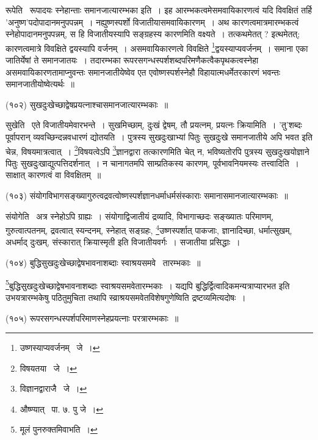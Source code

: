 \documentclass[11pt, openany]{book}
\begin{document}
{{\knu रूपेति} \textendash\ रूपादयः स्नेहान्ताः समानजात्यारम्भका इति~। इह आरम्भकत्वमेसमवायिकारणत्वं यदि विवक्षितं तर्हि 'अनुष्ण'पदोपादानमनुपपन्नम्~। नह्युष्णस्पर्शो विजातीयासमवायिकारणम्~। अथ कारणत्वमात्रमारम्भकत्वं स्नेहोपादानमनुपपन्नम्, स हि विजातीयस्यापि सङ्ग्रहस्य कारणमिति वक्ष्यते~। तत्कथमेतत् ? इत्थमेतत्; कारणत्वमात्रे विवक्षिते द्वयस्यापि वर्जनम्~। असमवायिकारणत्वे विवक्षिते \renewcommand{\thefootnote}{1}\footnote{उष्णस्याप्यवर्जनम् \textendash\ जे~।}द्वयस्याप्यवर्जनम्~। समाना एका जातिर्येषां ते समानजातयः~। तदारम्भका रूपरसगन्धस्पर्शशब्दपरिमणैकत्वैकपृथकत्वस्नेहा असमवायिकारणतामाप्नुवन्तः समानजातीयेष्वेव एत एवोष्णस्पर्शस्नेहौ विहायात्मधर्मेतरकारणं भवन्तः समानजातीयोष्वेत्यर्थः~॥

\hangindent=2cm {\knu (१०२) सुखदुःखेच्छाद्वेषप्रयत्नाश्चासमानजात्यारम्भकाः~॥}

{\knu सुखेति} \textendash\ एते विजातीयमेवारभन्ते~। सुखमिच्छाम्, दुःखं द्वेषम्, तौ प्रयत्नम्, प्रयत्नः क्रियामिति~। 'तु'शब्दः पूर्वापरान् व्यवच्छिन्दन्नवधारणं द्योतयति~। पुत्रस्य सुखदुःखाभ्यां पितुः सुखदुःखे समानजातीये अपि भवत इति चेन्न, विषयमात्रत्वात्~। \renewcommand{\thefootnote}{2}\footnote{विषयतया \textendash\ जे~।}विषयत्वेऽपि \renewcommand{\thefootnote}{3}\footnote{विज्ञानद्वाराजै \textendash\ जे~।}ज्ञानद्वारा तत्कारणमिति चेत् न, भविष्यतोरपि पुत्रस्य सुखदुःखयोज्ञाने पितुः सुखदुःखाद्युत्पत्तिदर्शनात्~। न चानागतमपि साम्प्रतिकस्य कारणम्, पूर्वभावनियमस्यः तत्त्वादिति~। साक्षात् कारणत्वं वा विवक्षितम्~॥

\hangindent=2cm {\knu (१०३) संयोगविभागसङ्ख्यागुरुत्वद्रवत्वोष्णस्पर्शज्ञानधर्माधर्मसंस्काराः समानासमानजात्यारम्भकाः~॥}

{\knu संयोगेति} \textendash\ अत्र स्नेहोऽपि ग्राह्यः~। संयोगाद्विजातीयं द्रव्यादि, विभागाच्छदः सङ्ख्यातः परिमाणम्, गुरुत्वात्पतनम्, द्रवत्वात् स्यन्दनम्, स्नेहात् सङ्ग्रहः, \renewcommand{\thefootnote}{4}\footnote{औष्ण्यात् \textendash\ पा. ७. पु जे~।}उष्णस्पर्शात् पाकजाः, ज्ञानादिच्छा, धर्मात्सुखम्, अधर्माद् दुःखम्, संस्कारात् क्रियास्मृती इति विजातीयवर्गः~। सजातीया प्रसिद्धाः~। 

\hangindent=2cm {\knu (१०४) बुद्धिसुखदुःखेच्छाद्वेषभावनाशब्दाः स्वाश्रयसमवे \textendash\ तारम्भकाः~॥}

\newpage
{\knu \renewcommand{\thefootnote}{1}\footnote{मूलं पुनरुक्तमिवाभति~।}बुद्धिसुखदुःखेच्छाद्वेषभावनाशब्दाः स्वाश्रयसमवेतारम्भकाः~।} यद्यपि बुद्धिर्द्वित्वादिकमन्यत्राप्यारभत इति उभयत्रारम्भकेषु पठितुमुचिता तथापि स्व्राश्रयसमवेतविशेषगुणेष्विति द्रष्टव्यमित्यदोषः~।

\hangindent=2cm {\knu (१०५) रूपरसगन्धस्पर्शपरिमाणस्नेहप्रयत्नाः परत्रारम्भकाः~॥}

}
\end{document}
